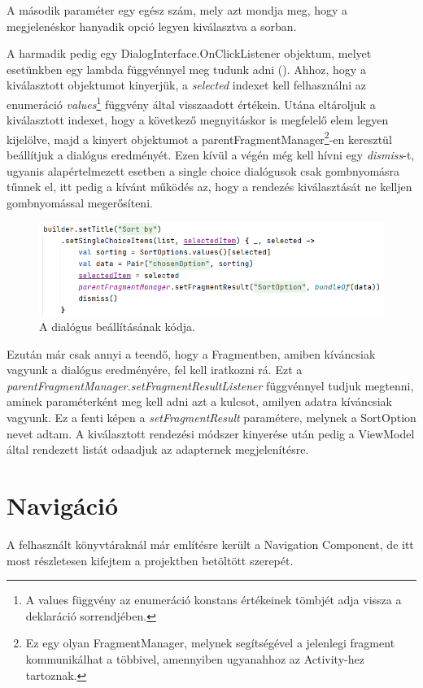 A második paraméter egy egész szám, mely azt mondja meg, hogy a megjelenéskor hanyadik opció legyen kiválasztva a sorban. 

A harmadik pedig egy DialogInterface.OnClickListener objektum, melyet esetünkben egy lambda függvénnyel meg tudunk adni (). Ahhoz, hogy a kiválasztott objektumot kinyerjük, a \emph{selected} indexet kell felhasználni az enumeráció \emph{values}\footnote{A values függvény az enumeráció konstans értékeinek tömbjét adja vissza a deklaráció sorrendjében.} függvény által visszaadott értékein. Utána eltároljuk a kiválasztott indexet, hogy a következő megnyitáskor is megfelelő elem legyen kijelölve, majd a kinyert objektumot a parentFragmentManager\footnote{Ez egy olyan FragmentManager, melynek segítségével a jelenlegi fragment kommunikálhat a többivel, amennyiben ugyanahhoz az Activity-hez tartoznak.}-en keresztül beállítjuk a dialógus eredményét. Ezen kívül a végén még kell hívni egy \emph{dismiss}-t, ugyanis alapértelmezett esetben a single choice dialógusok csak gombnyomásra tűnnek el, itt pedig a kívánt működés az, hogy a rendezés kiválasztását ne kelljen gombnyomással megerősíteni.

\begin{figure}[!ht]
	\centering
	\includegraphics[width=140mm, keepaspectratio]{figures/dialog_builder.png}
	\caption{A dialógus beállításának kódja.}
	\label{fig:DialogBuilder}
\end{figure}

Ezután már csak annyi a teendő, hogy a Fragmentben, amiben kíváncsiak vagyunk a dialógus eredményére, fel kell iratkozni rá. Ezt a \emph{parentFragmentManager.setFragmentResultListener} függvénnyel tudjuk megtenni, aminek paraméterként meg kell adni azt a kulcsot, amilyen adatra kíváncsiak vagyunk. Ez a fenti képen a \emph{setFragmentResult} paramétere, melynek a SortOption nevet adtam. A kiválasztott rendezési módszer kinyerése után pedig a ViewModel által rendezett listát odaadjuk az adapternek megjelenítésre. 

\section{Navigáció}
A felhasznált könyvtáraknál már említésre került a Navigation Component, de itt most részletesen kifejtem a projektben betöltött szerepét. 

